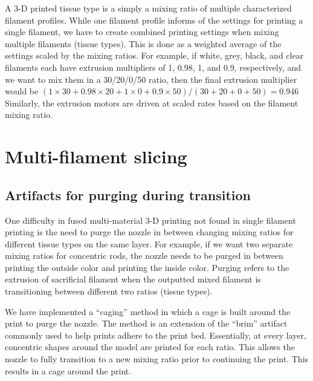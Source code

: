 A 3-D printed tissue type is a simply a mixing ratio of multiple characterized filament profiles. While one filament profile informs of the settings for printing a single filament, we have to create combined printing settings when mixing multiple filaments (tissue types). This is done as a weighted average of the settings scaled by the mixing ratios. For example, if white, grey, black, and clear filaments each have extrusion multipliers of 1, 0.98, 1, and 0.9, respectively, and we want to mix them in a 30/20/0/50 ratio, then the final extrusion multiplier would be
$(1\times30 + 0.98\times20 + 1\times0 + 0.9\times50) / (30+20+0+50) = 0.946$ Similarly, the extrusion motors are driven at scaled rates based on the filament mixing ratio.



\section{Multi-filament slicing}
\subsection{Artifacts for purging during transition}
One difficulty in fused multi-material 3-D printing not found in single filament printing is the need to purge the nozzle in between changing mixing ratios for different tissue types on the same layer. For example, if we want two separate mixing ratios for concentric rods, the nozzle needs to be purged in between printing the outside color and printing the inside color. Purging refers to the extrusion of sacrificial filament when the outputted mixed filament is transitioning between different two ratios (tissue types).

We have implemented a ``caging'' method in which a cage is built around the print to purge the nozzle. The method is an extension of the ``brim'' artifact commonly used to help prints adhere to the print bed. Essentially, at every layer, concentric shapes around the model are printed for each ratio. This allows the nozzle to fully transition to a new mixing ratio prior to continuing the print. This results in a cage around the print. 

